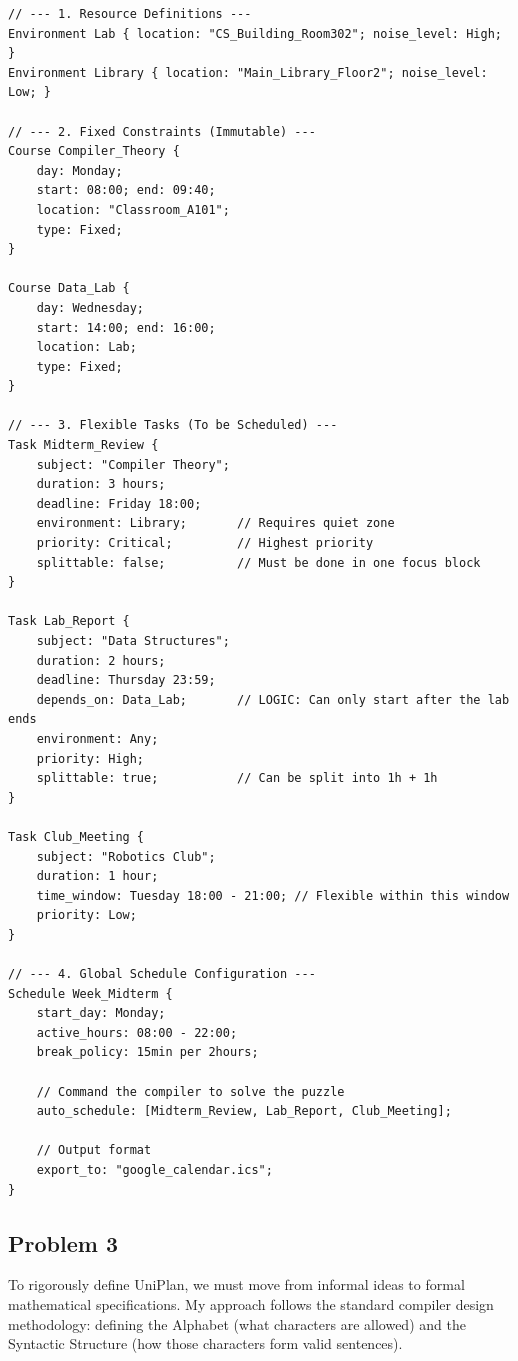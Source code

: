 \begin{lstlisting}[style=cleancpp]
// --- 1. Resource Definitions ---
Environment Lab { location: "CS_Building_Room302"; noise_level: High; }
Environment Library { location: "Main_Library_Floor2"; noise_level: Low; }

// --- 2. Fixed Constraints (Immutable) ---
Course Compiler_Theory {
    day: Monday;
    start: 08:00; end: 09:40;
    location: "Classroom_A101";
    type: Fixed;
}

Course Data_Lab {
    day: Wednesday;
    start: 14:00; end: 16:00;
    location: Lab;
    type: Fixed;
}

// --- 3. Flexible Tasks (To be Scheduled) ---
Task Midterm_Review {
    subject: "Compiler Theory";
    duration: 3 hours;
    deadline: Friday 18:00;
    environment: Library;       // Requires quiet zone
    priority: Critical;         // Highest priority
    splittable: false;          // Must be done in one focus block
}

Task Lab_Report {
    subject: "Data Structures";
    duration: 2 hours;
    deadline: Thursday 23:59;
    depends_on: Data_Lab;       // LOGIC: Can only start after the lab ends
    environment: Any;
    priority: High;
    splittable: true;           // Can be split into 1h + 1h
}

Task Club_Meeting {
    subject: "Robotics Club";
    duration: 1 hour;
    time_window: Tuesday 18:00 - 21:00; // Flexible within this window
    priority: Low;
}

// --- 4. Global Schedule Configuration ---
Schedule Week_Midterm {
    start_day: Monday;
    active_hours: 08:00 - 22:00;
    break_policy: 15min per 2hours;
    
    // Command the compiler to solve the puzzle
    auto_schedule: [Midterm_Review, Lab_Report, Club_Meeting];
    
    // Output format
    export_to: "google_calendar.ics";
}
\end{lstlisting}

\subsection{Problem 3}

To rigorously define UniPlan, we must move from informal ideas to formal mathematical specifications. My approach follows the standard compiler design methodology: defining the Alphabet (what characters are allowed) and the Syntactic Structure (how those characters form valid sentences).

